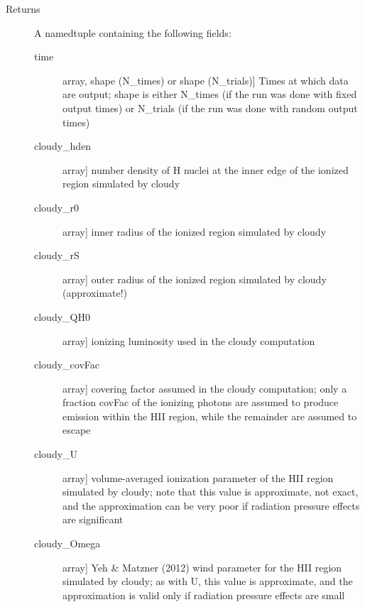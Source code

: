 \documentclass[letterpaper,10pt,english]{sphinxmanual}
\begin{document}
\begin{fulllineitems}
\begin{description}
\begin{description}
\end{description}

\item[{Returns}] \leavevmode
A namedtuple containing the following fields:
\begin{description}
\item[{time}] \leavevmode{[}array, shape (N\_times) or shape (N\_trials){]}
Times at which data are output; shape is either N\_times (if
the run was done with fixed output times) or N\_trials (if
the run was done with random output times)

\item[{cloudy\_hden}] \leavevmode{[}array{]}
number density of H nuclei at the inner edge of the ionized
region simulated by cloudy

\item[{cloudy\_r0}] \leavevmode{[}array{]}
inner radius of the ionized region simulated by cloudy

\item[{cloudy\_rS}] \leavevmode{[}array{]}
outer radius of the ionized region simulated by cloudy (approximate!)

\item[{cloudy\_QH0}] \leavevmode{[}array{]}
ionizing luminosity used in the cloudy computation

\item[{cloudy\_covFac}] \leavevmode{[}array{]}
covering factor assumed in the cloudy computation; only a
fraction covFac of the ionizing photons are assumed to
produce emission within the HII region, while the remainder
are assumed to escape

\item[{cloudy\_U}] \leavevmode{[}array{]}
volume-averaged ionization parameter of the HII region
simulated by cloudy; note that this value is approximate,
not exact, and the approximation can be very poor if
radiation pressure effects are significant

\item[{cloudy\_Omega}] \leavevmode{[}array{]}
Yeh \& Matzner (2012) wind parameter for the HII region
simulated by cloudy; as with U, this value is approximate,
and the approximation is valid only if radiation pressure
effects are small

\end{description}

\end{description}

\end{fulllineitems}
\end{document}
